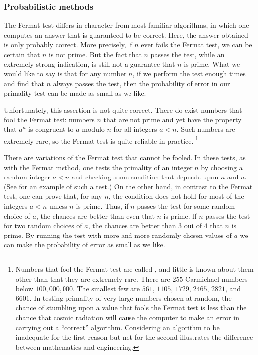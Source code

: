 \subsubsection*{Probabilistic methods}

The Fermat test differs in character from most familiar algorithms, in which one computes an answer that is guaranteed to be correct.
Here, the answer obtained is only probably correct.
More precisely, if \( n \) ever fails the Fermat test, we can be certain that \( n \) is not prime.
But the fact that \( n \) passes the test, while an extremely strong indication, is still not a guarantee that \( n \) is prime.
What we would like to say is that for any number \( n \), if we perform the test enough times and find that \( n \) always passes the test, then the probability of error in our primality test can be made as small as we like.

Unfortunately, this assertion is not quite correct.
There do exist numbers that fool the Fermat test:
numbers \( n \) that are not prime and yet have the property that \( a^n \) is congruent to \( a \) modulo \( n \) for all integers \( a < n \).
Such numbers are extremely rare, so the Fermat test is quite reliable in practice.%
\footnote{
	\label{Footnote 1.47}
	Numbers that fool the Fermat test are called , and little is known about them other than that they are extremely rare.
	There are \( 255 \) Carmichael numbers below \( 100,000,000 \).
	The smallest few are \( 561 \), \( 1105 \), \( 1729 \), \( 2465 \), \( 2821 \), and \( 6601 \).
	In testing primality of very large numbers chosen at random, the chance of stumbling upon a value that fools the Fermat test is less than the chance that cosmic radiation will cause the computer to make an error in carrying out a “correct” algorithm.
	Considering an algorithm to be inadequate for the first reason but not for the second illustrates the difference between mathematics and engineering.
}

There are variations of the Fermat test that cannot be fooled.
In these tests, as with the Fermat method, one tests the primality of an integer \( n \) by choosing a random integer \( a < n \) and checking some condition that depends upon \( n \) and \( a \).
(See  for an example of such a test.)
On the other hand, in contrast to the Fermat test, one can prove that, for any \( n \), the condition does not hold for most of the integers \( a < n \) unless \( n \) is prime.
Thus, if \( n \) passes the test for some random choice of \( a \), the chances are better than even that \( n \) is prime.
If \( n \) passes the test for two random choices of \( a \), the chances are better than \( 3 \) out of \( 4 \) that \( n \) is prime.
By running the test with more and more randomly chosen values of \( a \) we can make the probability of error as small as we like.

